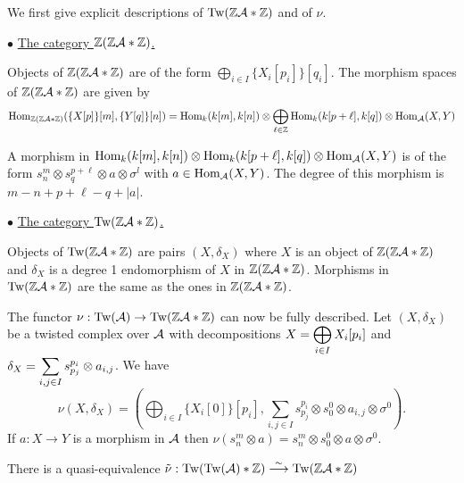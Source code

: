 \documentclass[12pt]{article}
\begin{document}
	\noindent We first give explicit descriptions of $\textup{Tw}(\mathbb{Z} {\cal{A}} * \mathbb{Z})$ and of $\nu$.
	
	\vspace{5mm}
	
	\noindent $\bullet$ \underline{The category $\mathbb{Z}(\mathbb{Z} {\cal{A}} * \mathbb{Z})$.}
	
	\noindent Objects of $\mathbb{Z}(\mathbb{Z} {\cal{A}} * \mathbb{Z})$ are of the form $\displaystyle\bigoplus_{i \in I} \{X_i[p_i]\}[q_i]$. The morphism spaces of $\mathbb{Z}(\mathbb{Z} {\cal{A}} * \mathbb{Z})$ are given by
	\[\textup{Hom}_{\mathbb{Z}(\mathbb{Z} {\cal{A}} * \mathbb{Z})}(\{X[p]\}[m],\{Y[q]\}[n]) = \textup{Hom}_{k}(k[m],k[n]) \otimes \bigoplus_{\ell \in \mathbb{Z}} \textup{Hom}_{k}(k[p+\ell],k[q]) \otimes \textup{Hom}_{\cal{A}}(X,Y)\]
	
	\noindent A morphism in $\textup{Hom}_{k}(k[m],k[n]) \otimes \textup{Hom}_{k}(k[p+\ell],k[q]) \otimes \textup{Hom}_{\cal{A}}(X,Y)$ is of the form $s^m_n \otimes s^{p+\ell}_q \otimes a \otimes \sigma^l$ with $a \in \textup{Hom}_{\cal{A}}(X,Y)$. The degree of this morphism is $m-n+p+\ell-q+|a|$. 
	
	\vspace{5mm}
	
	\noindent $\bullet$ \underline{The category $\textup{Tw}(\mathbb{Z} {\cal{A}} * \mathbb{Z})$.}
	
	\noindent Objects of $\textup{Tw}(\mathbb{Z} {\cal{A}} * \mathbb{Z})$ are pairs $(X,\delta_X)$ where $X$ is an object of $\mathbb{Z}(\mathbb{Z} {\cal{A}} * \mathbb{Z})$ and $\delta_X$ is a degree 1 endomorphism of $X$ in $\mathbb{Z}(\mathbb{Z} {\cal{A}} * \mathbb{Z})$. Morphisms in $\textup{Tw}(\mathbb{Z} {\cal{A}} * \mathbb{Z})$ are the same as the ones in $\mathbb{Z}(\mathbb{Z} {\cal{A}} * \mathbb{Z})$.
	
	\noindent The functor $\nu: \textup{Tw}({\cal{A}}) \to \textup{Tw}(\mathbb{Z} {\cal{A}} * \mathbb{Z})$ can now be fully described. Let $(X,\delta_X)$ be a twisted complex over ${\cal{A}}$ with decompositions $X = \displaystyle\bigoplus_{i \in I} X_i[p_i]$ and $\delta_X = \displaystyle\sum_{i,j \in I} s^{p_i}_{p_j} \otimes a_{i,j}$. We have
	\[\nu(X,\delta_X) = \left(\bigoplus_{i \in I} \{X_i[0]\}[p_i], \sum_{i,j \in I} s^{p_i}_{p_j} \otimes s^0_0 \otimes a_{i,j} \otimes \sigma^0 \right).\]
	If $a: X \to Y$ is a morphism in ${\cal{A}}$ then $\nu(s^m_n \otimes a) = s^m_n \otimes s^0_0 \otimes a \otimes \sigma^0$.
	
	\begin{theorem}
		\label{equione}
		There is a quasi-equivalence $\tilde{\nu}: \textup{Tw}(\textup{Tw}({\cal{A}})*\mathbb{Z}) \overset{\sim}{\longrightarrow} \textup{Tw}(\mathbb{Z} {\cal{A}} * \mathbb{Z})$
	\end{theorem}
	
\end{document}

